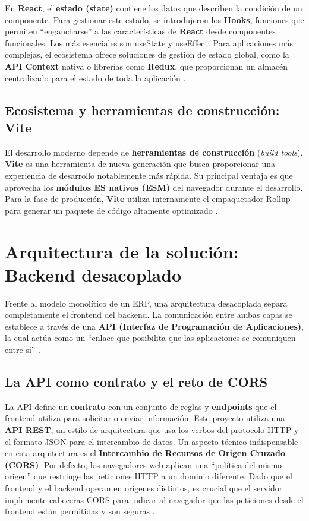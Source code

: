 \documentclass[12pt,letterpaper,spanish]{report}
\begin{document}
En \textbf{React}, el \textbf{estado (state)} contiene los datos que describen la condición de un componente. Para gestionar este estado, se introdujeron los \textbf{Hooks}, funciones que permiten ``engancharse'' a las características de \textbf{React} desde componentes funcionales. Los más esenciales son useState y useEffect. Para aplicaciones más complejas, el ecosistema ofrece soluciones de gestión de estado global, como la \textbf{API Context} nativa o librerías como \textbf{Redux}, que proporcionan un almacén centralizado para el estado de toda la aplicación \citep{ReactDocs2025}.

\subsection{Ecosistema y herramientas de construcción: Vite}
\label{sec:vite}
El desarrollo moderno depende de \textbf{herramientas de construcción} (\textit{build tools}). \textbf{Vite} es una herramienta de nueva generación que busca proporcionar una experiencia de desarrollo notablemente más rápida. Su principal ventaja es que aprovecha los \textbf{módulos ES nativos (ESM)} del navegador durante el desarrollo. Para la fase de producción, \textbf{Vite} utiliza internamente el empaquetador Rollup para generar un paquete de código altamente optimizado \citep{ViteDocs2025}.

\section{Arquitectura de la solución: Backend desacoplado}
\label{sec:arquitectura_solucion}
Frente al modelo monolítico de un ERP, una arquitectura desacoplada separa completamente el frontend del backend. La comunicación entre ambas capas se establece a través de una \textbf{API (Interfaz de Programación de Aplicaciones)}, la cual actúa como un ``enlace que posibilita que las aplicaciones se comuniquen entre sí'' \citep{TaipeQuishpe2022}.

\subsection{La API como contrato y el reto de CORS}
\label{sec:api_contrato_cors}
La API define un \textbf{contrato} con un conjunto de reglas y \textbf{endpoints} que el frontend utiliza para solicitar o enviar información. Este proyecto utiliza una \textbf{API REST}, un estilo de arquitectura que usa los verbos del protocolo HTTP y el formato JSON para el intercambio de datos. Un aspecto técnico indispensable en esta arquitectura es el \textbf{Intercambio de Recursos de Origen Cruzado (CORS)}. Por defecto, los navegadores web aplican una ``política del mismo origen'' que restringe las peticiones HTTP a un dominio diferente. Dado que el frontend y el backend operan en orígenes distintos, es crucial que el servidor implemente cabeceras CORS para indicar al navegador que las peticiones desde el frontend están permitidas y son seguras \citep{MDNCorsGuide}.
\end{document}
